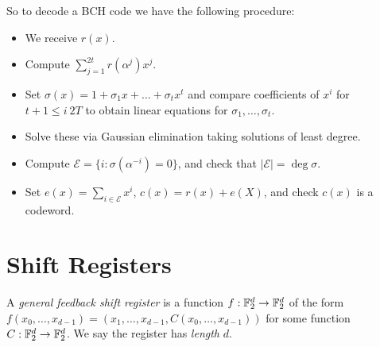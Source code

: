 \documentclass[10pt,a4paper]{article}
\begin{document}
So to decode a BCH code we have the following procedure:
\begin{itemize}
\item We receive $r(x)$.
\item Compute $\sum_{j=1}^{2t} r(\alpha^{j})x^j$.
\item Set $\sigma(x) = 1+ \sigma_1x+\ldots + \sigma_t x^t$ and compare coefficients of $x^i$ for $t+1\leq i\ 2T$ to obtain linear equations for $\sigma_1, \ldots, \sigma_t$.
\item Solve these via Gaussian elimination taking solutions of least degree.
\item Compute $\mathcal{E} = \{i: \sigma(\alpha^{-i}) = 0\}$, and check that $|\mathcal{E}| = \deg \sigma$.
\item Set $e(x) = \sum_{i \in \mathcal{E}} x^i$, $c(x) = r(x)+e(X)$, and check $c(x)$ is a codeword.
\end{itemize}

\section{Shift Registers}
A \emph{general feedback shift register} is a function $f:\mathbb{F}_2^d \to \mathbb{F}_2^d$ of the form $f(x_0, \ldots, x_{d-1}) = (x_1, \ldots, x_{d-1}, C(x_0, \ldots, x_{d-1}))$ for some function $C:\mathbb{F}_2^d \to \mathbb{F}_2^d$. We say the register has \emph{length} $d$.
\begin{figure}[H]
\begin{center}
\end{center}
\end{figure}
\end{document}
